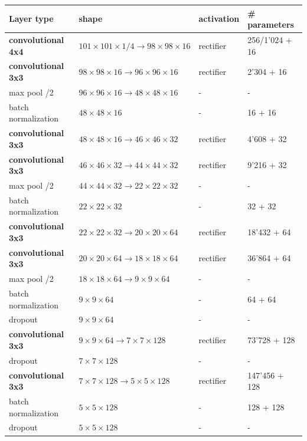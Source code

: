 \documentclass{aa}
\begin{document}
\begin{table}
    \centering
    \begin{tabular}{|l|l|l|l|}
        \hline
        Layer type & shape & activation & \# parameters \\ \hline \hline
        
        \textbf{convolutional 4x4} & $101\!\times\! 101\!\times\!1/4 \to 98\!\times\!98\!\times\!16$ & rectifier & 256/1'024 + 16 \\ \hline
        \textbf{convolutional 3x3} & $98\times98\times16 \to 96\times96\times16$ & rectifier & 2'304 + 16 \\ \hline
        max pool /2 & $96\times96\times16 \to 48\times48\times16$ & - & - \\ \hline
        batch normalization & $48\times48\times16$ & - & 16 + 16 \\ \hline
        
        \textbf{convolutional 3x3} & $48\times48\times16 \to 46\times46\times32$ & rectifier & 4'608 + 32 \\ \hline
        \textbf{convolutional 3x3} & $46\times46\times32 \to 44\times44\times32$ & rectifier & 9'216 + 32 \\ \hline
        max pool /2 & $44\times44\times32 \to 22\times22\times32$ & - & - \\ \hline
        batch normalization & $22\times22\times32$ & - & 32 + 32 \\ \hline
        
        \textbf{convolutional 3x3} & $22\times22\times32 \to 20\times20\times64$ & rectifier & 18'432 + 64 \\ \hline
        \textbf{convolutional 3x3} & $20\times20\times64 \to 18\times18\times64$ & rectifier & 36'864 + 64 \\ \hline
        max pool /2 & $18\times18\times64 \to 9\times9\times64$ & - & - \\ \hline
        batch normalization & $9\times9\times64$ & - & 64 + 64 \\ \hline
        dropout & $9\times9\times64$ & - & - \\ \hline
        
        \textbf{convolutional 3x3} & $9\times9\times64 \to 7\times7\times128$ & rectifier & 73'728 + 128 \\ \hline
        dropout & $7\times7\times128$ & - & - \\ \hline
        \textbf{convolutional 3x3} & $7\times7\times128 \to 5\times5\times128$ & rectifier & 147'456 + 128 \\ \hline
        batch normalization & $5\times5\times128$ & - & 128 + 128 \\ \hline
        dropout & $5\times5\times128$ & - & - \\ \hline
        

\end{tabular}
\end{table}
\end{document}
